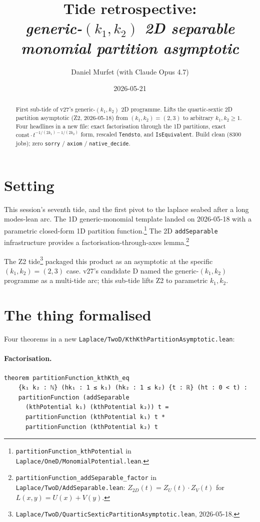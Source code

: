 \documentclass[11pt]{article}
\title{Tide retrospective:\\\emph{generic-$(k_1, k_2)$ 2D separable monomial partition asymptotic}}
\author{Daniel Murfet (with Claude Opus 4.7)}
\date{2026-05-21}
\begin{document}
\maketitle

\begin{abstract}
First sub-tide of v27's generic-$(k_1, k_2)$ 2D programme. Lifts the
quartic-sextic 2D partition asymptotic (Z2, 2026-05-18) from
$(k_1, k_2) = (2, 3)$ to arbitrary $k_1, k_2 \ge 1$. Four headlines
in a new file: exact factorisation through the 1D partitions, exact
$\mathrm{const}\cdot t^{-1/(2k_1) - 1/(2k_2)}$ form, rescaled
\texttt{Tendsto}, and \texttt{IsEquivalent}. Build clean (8300 jobs);
zero \texttt{sorry} / \texttt{axiom} / \texttt{native\_decide}.
\end{abstract}

\section{Setting}

This session's seventh tide, and the first pivot to the laplace
seabed after a long modes-lean arc. The 1D generic-monomial template
landed on 2026-05-18 with a parametric closed-form 1D partition
function.\footnote{\texttt{partitionFunction\_kthPotential} in
\texttt{Laplace/OneD/MonomialPotential.lean}.} The 2D
\texttt{addSeparable} infrastructure provides a
factorisation-through-axes lemma.\footnote{\texttt{partitionFunction\_addSeparable\_factor}
in \texttt{Laplace/TwoD/AddSeparable.lean}: $Z_{2D}(t) = Z_U(t) \cdot
Z_V(t)$ for $L(x,y) = U(x) + V(y)$.}

The Z2
tide\footnote{\texttt{Laplace/TwoD/QuarticSexticPartitionAsymptotic.lean},
2026-05-18.} packaged this product as an asymptotic at the
specific $(k_1, k_2) = (2, 3)$ case. v27's candidate D named the
generic-$(k_1, k_2)$ programme as a multi-tide arc; this sub-tide
lifts Z2 to parametric $k_1, k_2$.

\section{The thing formalised}

Four theorems in a new
\texttt{Laplace/TwoD/KthKthPartitionAsymptotic.lean}:

\paragraph{Factorisation.}
\begin{verbatim}
theorem partitionFunction_kthKth_eq
    {k₁ k₂ : ℕ} (hk₁ : 1 ≤ k₁) (hk₂ : 1 ≤ k₂) {t : ℝ} (ht : 0 < t) :
    partitionFunction (addSeparable
      (kthPotential k₁) (kthPotential k₂)) t =
      partitionFunction (kthPotential k₁) t *
      partitionFunction (kthPotential k₂) t
\end{verbatim}
\end{document}
